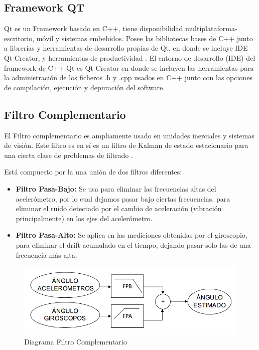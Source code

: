 \documentclass[12pt,a4paper]{article}
\begin{document}
\subsection{Framework QT}
Qt\cite{QT} es un Framework basado en C++, tiene disponibilidad multiplataforma- escritorio, móvil y sistemas embebidos.
Posee las bibliotecas bases de C++  junto a librerías y herramientas de desarrollo propias de Qt, en donde se incluye IDE Qt Creator, y herramientas de productividad .
El entorno de desarrollo (IDE) del framework de C++ Qt  es Qt Creator en donde se incluyen las herramientas para la administración de los ficheros .h y .cpp usados en C++ junto con las opciones de compilación, ejecución y depuración del software.


\subsection{Filtro Complementario}
El Filtro complementario es ampliamente usado en unidades inerciales y sistemas de visión. Este filtro es en sí es un filtro de Kalman de estado estacionario para una cierta clase de problemas de filtrado \cite{TesisUSM}.

Está compuesto por la una unión de dos filtros diferentes:
\begin{itemize}
	\item \textbf{Filtro Pasa-Bajo:} Se usa para eliminar las frecuencias altas del acelerómetro, por lo cual dejamos pasar bajo ciertas frecuencias, para eliminar el ruido detectado por el cambio de aceleración (vibración principalmente) en los ejes del acelerómetro.
	\item \textbf{Filtro Pasa-Alto:} Se aplica en las mediciones obtenidas por el giroscopio, para eliminar el drift acumulado en el tiempo, dejando pasar solo las de una frecuencia más alta.
	\end{itemize}
	
	\begin{figure}[H]
		\centering
		\includegraphics[scale=0.5]{images/FiltroComplementario}
		\caption{Diagrama Filtro Complementario}
		\label{fig:diagramafiltrocomplementario}
		\end{figure}
		
\end{document}
